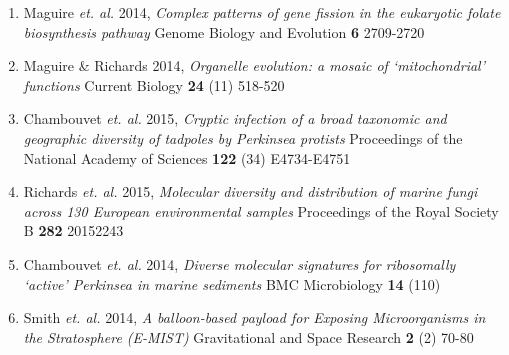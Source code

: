 % 

\begin{enumerate}
    \item Maguire \textit{et. al.} 2014, \textit{Complex patterns of gene fission in the eukaryotic folate biosynthesis pathway} Genome Biology and Evolution \textbf{6} 2709-2720
    \item Maguire \& Richards 2014, \textit{Organelle evolution: a mosaic of `mitochondrial' functions} Current Biology \textbf{24} (11) 518-520
    \item Chambouvet \textit{et. al.} 2015, \textit{Cryptic infection of a broad taxonomic and geographic diversity of tadpoles by Perkinsea protists} Proceedings of the National Academy of Sciences \textbf{122} (34) E4734-E4751
    \item Richards \textit{et. al.} 2015, \textit{Molecular diversity and distribution of marine fungi across 130 European environmental samples} Proceedings of the Royal Society B \textbf{282} 20152243 
    \item Chambouvet \textit{et. al.} 2014, \textit{Diverse molecular signatures for ribosomally ‘active’ Perkinsea in marine sediments} BMC Microbiology \textbf{14} (110) 
    \item Smith \textit{et. al.} 2014, \textit{A balloon-based payload for Exposing Microorganisms in the Stratosphere (E-MIST)} Gravitational and Space Research \textbf{2} (2) 70-80
\end{enumerate}


